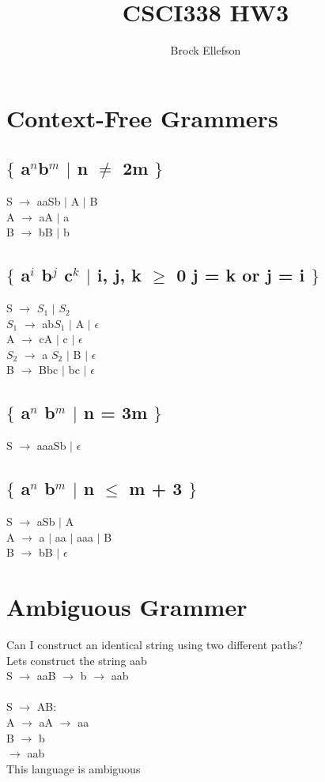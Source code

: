 \documentclass[10pt,a4paper]{article}
\author{Brock Ellefson}
\title{CSCI338 HW3}
\begin{document}
\maketitle

\section{Context-Free Grammers}
\subsection{$\lbrace$ a$^{n}$b$^{m}$ $\mid$ n $\neq$ 2m $\rbrace$}
	S $\rightarrow$ aaSb $\mid$ A $\mid$ B \\
	A $\rightarrow$ aA $\mid$ a \\
	B $\rightarrow$ bB $\mid$ b
	
\subsection{$\lbrace$ a$^{i}$ b$^{j}$ c$^{k}$ $\mid$ i, j, k $\geq$ 0 j = k or j = i $\rbrace$}
	S $\rightarrow$ $S_{1}$ $\mid$ $S_{2}$ \\
	$S_{1}$  $\rightarrow$ ab$S_{1}$ $\mid$ A $\mid$ $\epsilon$ \\
	A $\rightarrow$ cA $\mid$ c $\mid$ $\epsilon$ \\
	$S_{2}$ $\rightarrow$ a $S_{2}$ $\mid$ B $\mid$ $\epsilon$ \\
	B $\rightarrow$ Bbc $\mid$ bc $\mid$ $\epsilon$
	
\subsection{$\lbrace$ a$^{n}$ b$^{m}$ $\mid$ n = 3m $\rbrace$}
	S $\rightarrow$ aaaSb $\mid$ $\epsilon$ \\
	
\subsection{$\lbrace$ a$^{n}$ b$^{m}$ $\mid$ n $\leq$ m + 3 $\rbrace$}	
	S $\rightarrow$ aSb $\mid$ A \\
	A $\rightarrow$ a $\mid$ aa $\mid$ aaa $\mid$ B \\
	B $\rightarrow$ bB  $\mid$ $\epsilon$
	
	
	
	
	 \newpage
	 
\section{Ambiguous Grammer}
	Can I construct an identical string using two different paths?\\
	Lets construct the string aab\\
	S $\rightarrow$ aaB $\rightarrow$ b $\rightarrow$ aab \\\\
	S $\rightarrow$ AB:\\
	A $\rightarrow$ aA $\rightarrow$ aa\\
	B $\rightarrow$ b\\
	$\rightarrow$ aab\\
	This language is ambiguous
	
\end{document}
